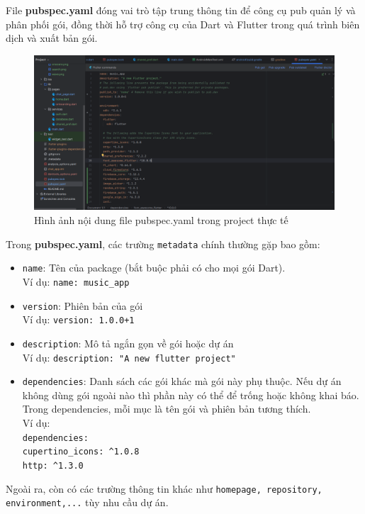\documentclass[../DoAn.tex]{subfiles}
\numberwithin{figure}{chapter}
\begin{document}
File \textbf{pubspec.yaml} đóng vai trò tập trung thông tin để công cụ pub quản lý và phân phối gói, đồng thời hỗ trợ công cụ của Dart và Flutter trong quá trình biên dịch và xuất bản gói. 

\begin{figure}[H]
    \centering
    \includegraphics[width=1\textwidth]{Hinhve/pubspec.png}
    \caption{Hình ảnh nội dung file pubspec.yaml trong project thực tế}
    \label{fig:pubspec.png}
\end{figure}

Trong \textbf{pubspec.yaml}, các trường \texttt{metadata} chính thường gặp bao gồm:
\begin{itemize}
    \item \texttt{name}: Tên của package (bắt buộc phải có cho mọi gói Dart). \\
    Ví dụ: \texttt{name: music\_app}
    \item \texttt{version}: Phiên bản của gói \\
    Ví dụ: \texttt{version: 1.0.0+1}
    \item \texttt{description}: Mô tả ngắn gọn về gói hoặc dự án \\
    Ví dụ: \texttt{description: "A new flutter project"} 
    \item \texttt{dependencies}: Danh sách các gói khác mà gói này phụ thuộc. Nếu dự án không dùng gói ngoài nào thì phần này có thể để trống hoặc không khai báo. Trong dependencies, mỗi mục là tên gói và phiên bản tương thích. \\
    Ví dụ: \\
    \texttt{dependencies:} \\
        \texttt{cupertino\_icons: \^{}1.0.8} \\
        \texttt{http: \^{}1.3.0}
\end{itemize} 

Ngoài ra, còn có các trường thông tin khác như \texttt{homepage, repository, environment,...} tùy nhu cầu dự án. 
\end{document}
